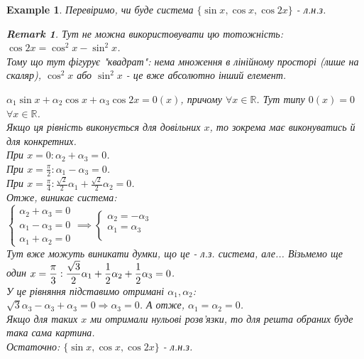 \documentclass[a4paper, 10pt]{article}
\def\huge{\displaystyle}
\theoremstyle{theoremdd}
\theoremstyle{theoremdd}
\theoremstyle{theoremdd}
\theoremstyle{theoremdd}
\newtheorem{example}[theorem]{Example}
\theoremstyle{theoremdd}
\theoremstyle{theoremdd}
\newtheorem{remark}[theorem]{Remark}
\theoremstyle{theoremdd}
\theoremstyle{theoremdd}
\begin{document}
	\begin{example}
	Перевіримо, чи буде система $\{\sin x, \cos x, \cos 2x\}$ - л.н.з.
	
	\begin{remark}
	Тут не можна використовувати цю тотожність: $\cos 2x = \cos ^2 x - \sin ^2 x$. \\ 
	Тому що тут фігурує "квадрат": нема множення в лінійному просторі (лише на скаляр), $\cos^2 x$ або $\sin^2 x$ - це вже абсолютно інший елемент.
	\end{remark}
	$\alpha_1 \sin x + \alpha_2 \cos x + \alpha_3 \cos 2x = 0(x)$, причому $\forall x \in \mathbb{R}$. Тут типу $0(x) = 0$ $\forall x \in \mathbb{R}$.\\
	Якщо ця рівність виконується для довільних $x$, то зокрема має виконуватись й для конкретних.\\
	При $\huge x = 0: \alpha_2 + \alpha_3 = 0$.\\
	При $\huge x = \frac{\pi}{2}: \alpha_1 - \alpha_3 = 0$.\\
	При $\huge x = \frac{\pi}{4}: \frac{\sqrt{2}}{2} \alpha_1 + \frac{\sqrt{2}}{2} \alpha_2 = 0$.\\
	Отже, виникає система:\\
	$\begin{cases}
	\alpha_2 + \alpha_3 = 0\\
	\alpha_1 - \alpha_3 = 0\\
	\alpha_1 + \alpha_2 = 0
	\end{cases}
	\implies
	\begin{cases}
	\alpha_2 =  -\alpha_3\\
	\alpha_1 = \alpha_3\\
	\end{cases}
	$\\
	Тут вже можуть виникати думки, що це - л.з. система, але... Візьмемо ще один $\huge x = \frac{\pi}{3}: \\ \frac{\sqrt{3}}{2}\alpha_1 + \frac{1}{2}\alpha_2 + \frac{1}{2}\alpha_3 = 0$.\\
	У це рівняння підставимо отримані $\alpha_1,\alpha_2$:\\
	$\sqrt{3}\alpha_3 - \alpha_3 + \alpha_3 = 0 \Rightarrow \alpha_3 = 0$. А отже, $\alpha_1 = \alpha_2 = 0$.\\
	Якщо для таких $x$ ми отримали нульові розв'язки, то для решта обраних буде така сама картина.\\
	Остаточно: $\{\sin x, \cos x, \cos 2x\}$ - л.н.з.
	\end{example}
	
\end{document}
